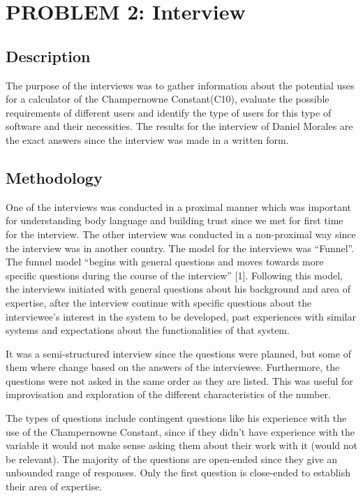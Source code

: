 \documentclass{report}
\begin{document}
\section{PROBLEM 2: Interview}

\subsection{Description} %

The purpose of the interviews was to gather information about the potential uses for a calculator of the Champernowne Constant(C10), evaluate the possible requirements of different users and identify the type of users for this type of software and their necessities. The results for the interview of Daniel Morales are the exact answers since the interview was made in a written form.

\subsection{Methodology} %

One of the interviews was conducted in a proximal manner which was important for understanding body language and building trust since we met for first time for the interview. The other interview was conducted in a non-proximal way since the interview was in another country. The model for the interviews was “Funnel”. The funnel model “begins with general questions and moves towards more specific questions during the course of the interview” [1]. Following this model, the interviews initiated with general questions about his background and area of expertise, after the interview continue with specific questions about the interviewee’s interest in the system to be developed, past experiences with similar systems and expectations about the functionalities of that system.

It was a semi-structured interview since the questions were planned, but some of them where change based on the answers of the interviewee. Furthermore, the questions were not asked in the same order as they are listed. This was useful for improvisation and exploration of the different characteristics of the number.

The types of questions include contingent questions like his experience with the use of the Champernowne Constant, since if they didn't have experience with the variable it would not make sense asking them about their work with it (would not be relevant). The majority of the questions are open-ended since they give an unbounded range of responses. Only the first question is close-ended to establish their area of expertise.
\end{document}

